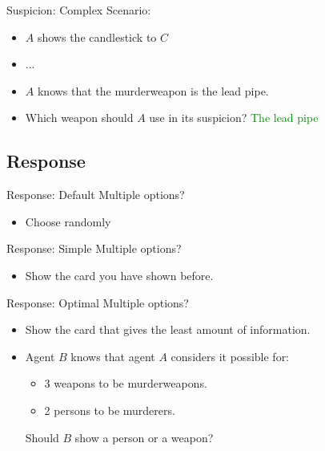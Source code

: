 
\begin{frame}{Suspicion: Complex}
  Scenario:
  \begin{itemize}
    \item $A$ shows the candlestick to $C$ 
    \item ...
    \item $A$ knows that the murderweapon is the lead pipe.
    \item Which weapon should $A$ use in its suspicion? \textcolor{green}{The lead pipe}
  \end{itemize}
\end{frame}


\subsection{Response}
\begin{frame}{Response: Default}
Multiple options?
  \begin{itemize}
  \item Choose randomly
  \end{itemize}
\end{frame}

\begin{frame}{Response: Simple}
Multiple options?
  \begin{itemize}
  \item Show the card you have shown before.
  \end{itemize}
\end{frame}

\begin{frame}{Response: Optimal}
Multiple options?
  \begin{itemize}
  \item Show the card that gives the least amount of information.
  \item Agent $B$ knows that agent $A$ considers it possible for:
  \begin{itemize}
    \item 3 weapons to be murderweapons.
    \item 2 persons to be murderers. 
  \end{itemize}
  Should $B$ show a person or a weapon?
  \end{itemize}
\end{frame}

